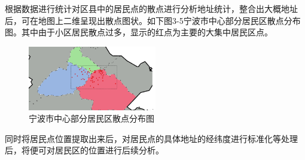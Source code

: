 根据数据进行统计对区县中的居民点的散点进行分析地址统计，整合出大概地址后，可在地图上二维呈现出散点图状。如下图3-5宁波市中心部分居民区散点分布图。其中由于小区居民散点过多，显示的红点为主要的大集中居民区点。
\begin{figure}[h]
     \centering
     \includegraphics[width=0.5\textwidth]{fig3/fig35.png}
     \caption{宁波市中心部分居民区散点分布图}
     \label{fig:my_label}
\end{figure}
\FloatBarrier
 同时将居民点位置提取出来后，对居民点的具体地址的经纬度进行标准化等处理后，将便可对居民区的位置进行后续分析。
